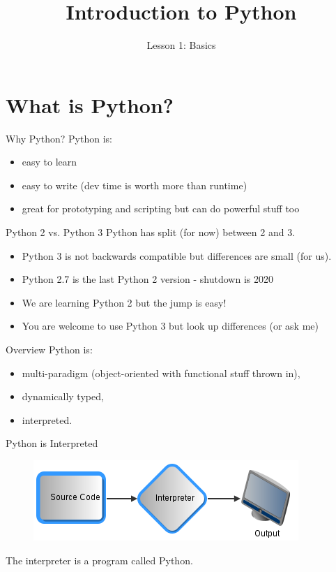 \documentclass{beamer}
\title{Introduction to Python}
\subtitle{Lesson 1: Basics}
\begin{document}
\begin{frame}
  \titlepage
\end{frame}

\section{What is Python?}
\begin{frame}[fragile]{Why Python?}
  Python is:
  \begin{itemize}
	\item easy to learn
	\item easy to write (dev time is worth more than runtime)
	\item great for prototyping and scripting but can do powerful stuff too
  \end{itemize}
\end{frame}
\begin{frame}[fragile]{Python 2 vs. Python 3}
  Python has split (for now) between 2 and 3.
  \begin{itemize}
	\item Python 3 is not backwards compatible but differences are small (for us).
	\item Python 2.7 is the last Python 2 version - shutdown is 2020
	\item We are learning Python 2 but the jump is easy!
	\item You are welcome to use Python 3 but look up differences (or ask me)
  \end{itemize}
\end{frame}
\begin{frame}[fragile]{Overview}
  Python is:
  \begin{itemize}
	\item multi-paradigm (object-oriented with functional stuff thrown in),
	\item dynamically typed,
	\item interpreted.
  \end{itemize}
\end{frame}
\begin{frame}[fragile]{Python is Interpreted}
\begin{figure}[!ht]
\includegraphics[scale=.7]{380px-Interpreted_Code_Flow_Diagram.png}
\end{figure}
The interpreter is a program called Python.
\end{frame}
\end{document}
